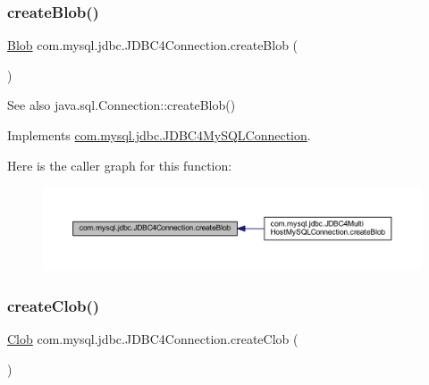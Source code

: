 \subsubsection{\texorpdfstring{create\+Blob()}{createBlob()}}
{\footnotesize\ttfamily \mbox{\hyperlink{classcom_1_1mysql_1_1jdbc_1_1_blob}{Blob}} com.\+mysql.\+jdbc.\+J\+D\+B\+C4\+Connection.\+create\+Blob (\begin{DoxyParamCaption}{ }\end{DoxyParamCaption})}

\begin{DoxySeeAlso}{See also}
java.\+sql.\+Connection\+::create\+Blob() 
\end{DoxySeeAlso}


Implements \mbox{\hyperlink{interfacecom_1_1mysql_1_1jdbc_1_1_j_d_b_c4_my_s_q_l_connection}{com.\+mysql.\+jdbc.\+J\+D\+B\+C4\+My\+S\+Q\+L\+Connection}}.

Here is the caller graph for this function\+:
\nopagebreak
\begin{figure}[H]
\begin{center}
\leavevmode
\includegraphics[width=350pt]{classcom_1_1mysql_1_1jdbc_1_1_j_d_b_c4_connection_a3b0ede9b029e66047df426bbf0dc6ba3_icgraph}
\end{center}
\end{figure}
\mbox{\label{classcom_1_1mysql_1_1jdbc_1_1_j_d_b_c4_connection_a289c31cdb97f40e0fb1411cb0600b212}} 
\subsubsection{\texorpdfstring{create\+Clob()}{createClob()}}
{\footnotesize\ttfamily \mbox{\hyperlink{classcom_1_1mysql_1_1jdbc_1_1_clob}{Clob}} com.\+mysql.\+jdbc.\+J\+D\+B\+C4\+Connection.\+create\+Clob (\begin{DoxyParamCaption}{ }\end{DoxyParamCaption})}

